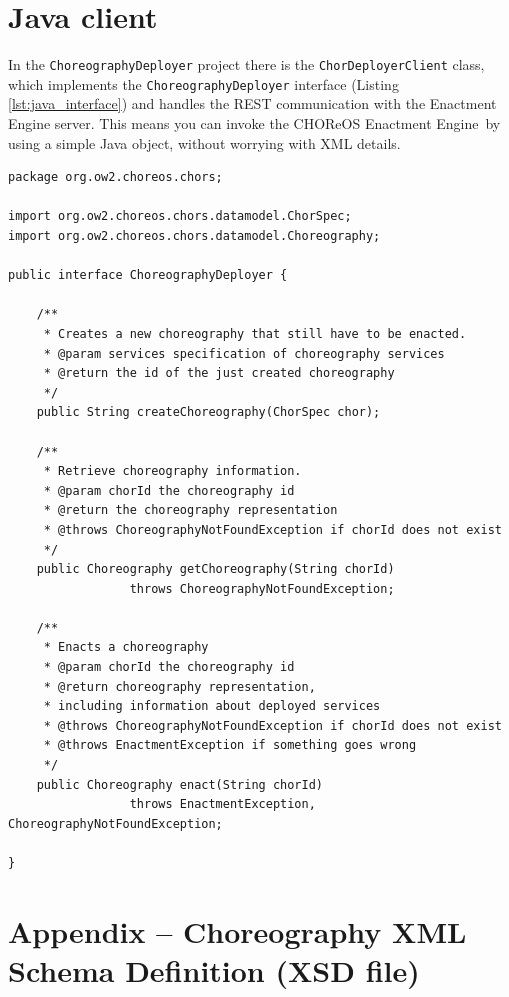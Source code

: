 \documentclass[a4paper, 10pt]{article}
\newcommand{\ee}{CHOReOS Enactment Engine}
\begin{document}
\section{Java client}
\label{sec:client}

In the \verb!ChoreographyDeployer! project there is the \verb!ChorDeployerClient! class, which implements the \verb!ChoreographyDeployer! interface (Listing \ref{lst:java_interface}) and handles the REST communication with the Enactment Engine server. This means you can invoke the \ee\ by using a simple Java object, without worrying with XML details.

\lstset{language=Java}
\begin{lstlisting}[caption=\ee\ Java interface, label=lst:java_interface]
package org.ow2.choreos.chors;

import org.ow2.choreos.chors.datamodel.ChorSpec;
import org.ow2.choreos.chors.datamodel.Choreography;

public interface ChoreographyDeployer {
	
	/**
	 * Creates a new choreography that still have to be enacted.
	 * @param services specification of choreography services
	 * @return the id of the just created choreography
	 */
	public String createChoreography(ChorSpec chor);
	
	/**
	 * Retrieve choreography information.
	 * @param chorId the choreography id
	 * @return the choreography representation
	 * @throws ChoreographyNotFoundException if chorId does not exist 
	 */
	public Choreography getChoreography(String chorId) 
	             throws ChoreographyNotFoundException;

	/**
	 * Enacts a choreography
	 * @param chorId the choreography id
	 * @return choreography representation, 
	 * including information about deployed services 
	 * @throws ChoreographyNotFoundException if chorId does not exist 
	 * @throws EnactmentException if something goes wrong 
	 */
	public Choreography enact(String chorId) 
	             throws EnactmentException, ChoreographyNotFoundException;
	
}
\end{lstlisting}

\section*{Appendix -- Choreography XML Schema Definition (XSD file)}
\end{document}

